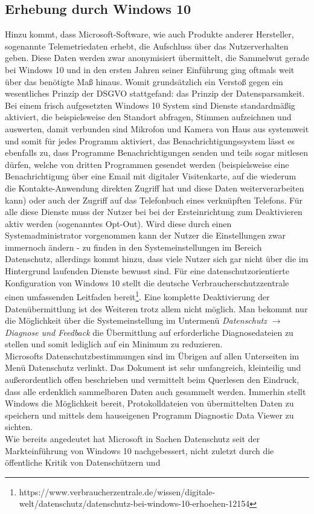 \subsection{Erhebung durch Windows 10}
Hinzu kommt, dass Microsoft-Software, wie auch Produkte anderer Hersteller, sogenannte Telemetriedaten erhebt, die Aufschluss über das Nutzerverhalten geben. Diese Daten werden zwar anonymisiert übermittelt, die Sammelwut gerade bei Windows 10 und in den ersten Jahren seiner Einführung ging oftmals weit über das benötigte Maß hinaus. Womit grundsätzlich ein Verstoß gegen ein wesentliches Prinzip der DSGVO stattgefand: das Prinzip der Datensparsamkeit. Bei einem frisch aufgesetzten Windows 10 System sind Dienste standardmäßig aktiviert, die beispielsweise den Standort abfragen, Stimmen aufzeichnen und auswerten, damit verbunden sind Mikrofon und Kamera von Haus aus systemweit und somit für jedes Programm aktiviert, das Benachrichtigungssystem lässt es ebenfalls zu, dass Programme Benachrichtigungen senden und teils sogar mitlesen dürfen, welche von dritten Programmen gesendet werden (beispielsweise eine Benachrichtigung über eine Email mit digitaler Visitenkarte, auf die wiederum die Kontakte-Anwendung direkten Zugriff hat und diese Daten weiterverarbeiten kann) oder auch der Zugriff auf das Telefonbuch eines verknüpften Telefons. Für alle diese Dienste muss der Nutzer bei bei der Ersteinrichtung zum Deaktivieren aktiv werden (sogenanntes Opt-Out). Wird diese durch einen Systemadministrator vorgenommen kann der Nutzer die Einstellungen zwar immernoch ändern - zu finden in den Systemeinstellungen im Bereich \glqq Datenschutz\grqq{}, allerdings kommt hinzu, dass viele Nutzer sich gar nicht über die im Hintergrund laufenden Dienste bewusst sind. Für eine datenschutzorientierte Konfiguration von Windows 10 stellt die deutsche Verbraucherschutzzentrale einen umfassenden Leitfaden bereit\footnote[1]{https://www.verbraucherzentrale.de/wissen/digitale-welt/datenschutz/datenschutz-bei-windows-10-erhoehen-12154}. Eine komplette Deaktivierung der Datenübermittlung ist des Weiteren trotz allem nicht möglich. Man bekommt nur die Möglichkeit über die Systemeinstellung im Untermenü \textit{Datenschutz $\rightarrow$ Diagnose und Feedback} die Übermittlung auf \glqq erforderliche Diagnosedateien\grqq{} zu stellen und somit lediglich auf ein Minimum zu reduzieren.\\
Microsofts Datenschutzbestimmungen sind im Übrigen auf allen Unterseiten im Menü \glqq Datenschutz\grqq{} verlinkt. Das Dokument ist sehr umfangreich, kleinteilig und außerordentlich offen beschrieben und vermittelt beim Querlesen den Eindruck, dass alle erdenklich sammelbaren Daten auch gesammelt werden. Immerhin stellt Windows die Möglichkeit bereit, Protokolldateien von übermittelten Daten zu speichern und mittels dem hauseigenen Programm \glqq Diagnostic Data Viewer\grqq{} zu sichten.\\
Wie bereits angedeutet hat Microsoft in Sachen Datenschutz seit der Markteinführung von Windows 10 nachgebessert, nicht zuletzt durch die öffentliche Kritik von Datenschützern und 

